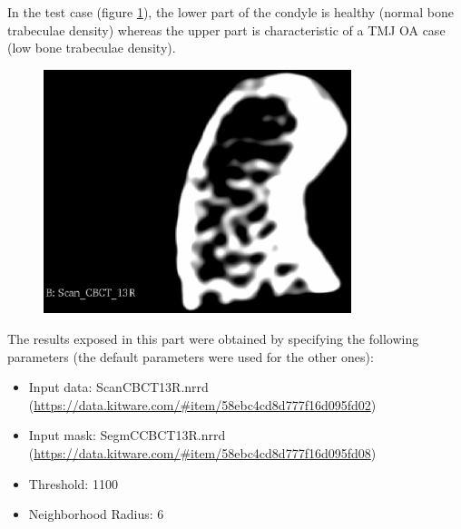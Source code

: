 \documentclass{InsightArticle}
\begin{document}
In the test case (figure \ref{fig:Scan}), the lower part of the condyle is healthy (normal bone trabeculae density) whereas the upper part is characteristic of a TMJ OA case (low bone trabeculae density).

\begin{figure}[H]
  \begin{center}
    \includegraphics[width=0.8\textwidth]{figures/Scan.eps}
    \label{fig:Scan}
  \end{center}
\end{figure}

The results exposed in this part were obtained by specifying the following parameters (the default parameters were used for the other ones):

\begin{itemize}
 \item Input data: Scan\textunderscore CBCT\textunderscore 13R.nrrd (\url{https://data.kitware.com/#item/58ebc4cd8d777f16d095fd02})
 \item Input mask: SegmC\textunderscore CBCT\textunderscore 13R.nrrd  (\url{https://data.kitware.com/#item/58ebc4cd8d777f16d095fd08})
 \item Threshold: 1100
 \item Neighborhood Radius: 6
\end{itemize}
\end{document}
